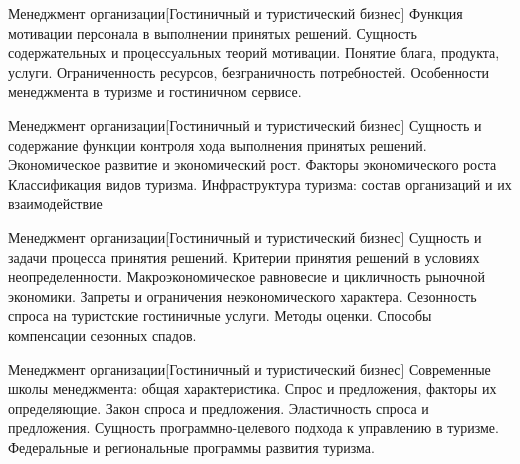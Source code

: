 \documentclass[
	11pt,
	a4paper,
	]
	{article}
\begin{document}
\vfill



\begin{minipage}[t][\miniH]{\miniL}\centering
	 {Менеджмент организации}[Гостиничный и туристический бизнес]
		{
			Функция мотивации персонала в выполнении принятых решений. Сущность содержательных и процессуальных теорий мотивации.
		}{
			Понятие блага, продукта, услуги. Ограниченность ресурсов, безграничность потребностей.
		}{
			Особенности менеджмента в туризме и гостиничном сервисе.
		}
	\lowGE
\end{minipage}





\begin{minipage}[t][\miniH]{\miniL}\centering
	 {Менеджмент организации}[Гостиничный и туристический бизнес]
		{
			Сущность и содержание функции контроля хода выполнения принятых решений.
		}{
			Экономическое развитие и экономический рост. Факторы экономического роста
		}{
			Классификация видов туризма. Инфраструктура туризма: состав организаций и их взаимодействие
		}
	\lowGE
\end{minipage}

\vfill



\begin{minipage}[t][\miniH]{\miniL}\centering
	 {Менеджмент организации}[Гостиничный и туристический бизнес]
		{
			Сущность и задачи процесса принятия решений. Критерии принятия решений в условиях неопределенности.
		}{
			Макроэкономическое равновесие и цикличность рыночной экономики. Запреты и ограничения неэкономического характера.
		}{
			Сезонность спроса на туристские гостиничные услуги. Методы оценки. Способы компенсации сезонных спадов.
		}
	\lowGE
\end{minipage}

\vfill



\begin{minipage}[t][\miniH]{\miniL}\centering
	 {Менеджмент организации}[Гостиничный и туристический бизнес]
		{
			Современные школы менеджмента: общая характеристика.
		}{
			Спрос и предложения, факторы их определяющие. Закон спроса и предложения. Эластичность спроса и предложения.
		}{
			Сущность программно-целевого подхода к управлению в туризме. Федеральные и региональные программы развития туризма.
		}
	\lowGE
\end{minipage}
\end{document}
